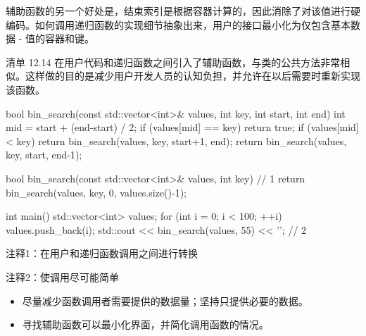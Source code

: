 辅助函数的另一个好处是，结束索引是根据容器计算的，因此消除了对该值进行硬编码。如何调用递归函数的实现细节抽象出来，用户的接口最小化为仅包含基本数据 - 值的容器和键。

清单 12.14 在用户代码和递归函数之间引入了辅助函数，与类的公共方法非常相似。这样做的目的是减少用户开发人员的认知负担，并允许在以后需要时重新实现该函数。


\begin{cpp}
bool bin_search(const std::vector<int>& values, int key, int start, int end) {
  int mid = start + (end-start) / 2;
  if (values[mid] == key)
    return true;
  if (values[mid] < key)
    return bin_search(values, key, start+1, end);
  return bin_search(values, key, start, end-1);
}

bool bin_search(const std::vector<int>& values, int key) { // 1
  return bin_search(values, key, 0, values.size()-1);
}

int main() {
  std::vector<int> values;
  for (int i = 0; i < 100; ++i)
    values.push_back(i);
  std::cout << bin_search(values, 55) << '\n'; // 2
}
\end{cpp}

{\footnotesize
注释1：在用户和递归函数调用之间进行转换

注释2：使调用尽可能简单
}


\begin{itemize}
\item
尽量减少函数调用者需要提供的数据量；坚持只提供必要的数据。

\item
寻找辅助函数可以最小化界面，并简化调用函数的情况。
\end{itemize}









